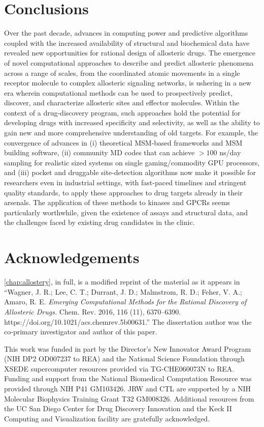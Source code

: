 \section{Conclusions}
\par Over the past decade, advances in computing power and predictive algorithms coupled with the increased availability of structural and biochemical data have revealed new opportunities for rational design of allosteric drugs. The emergence of novel computational approaches to describe and predict allosteric phenomena across a range of scales, from the coordinated atomic movements in a single receptor molecule to complex allosteric signaling networks, is ushering in a new era wherein computational methods can be used to prospectively predict, discover, and characterize allosteric sites and effector molecules. Within the context of a drug-discovery program, such approaches hold the potential for developing drugs with increased specificity and selectivity, as well as the ability to gain new and more comprehensive understanding of old targets. For example, the convergence of advances in (i) theoretical MSM-based frameworks and MSM building software, (ii) community MD codes that can achieve $>100$ ns/day sampling for realistic sized systems on single gaming/commodity GPU processors, and (iii) pocket and druggable site-detection algorithms now make it possible for researchers even in industrial settings, with fast-paced timelines and stringent quality standards, to apply these approaches to drug targets already in their arsenals. The application of these methods to kinases and GPCRs seems particularly worthwhile, given the existence of assays and structural data, and the challenges faced by existing drug candidates in the clinic.
\section{Acknowledgements}
\par \cref{chap:allostery}, in full, is a modified reprint of the material as it appears in ``Wagner, J. R.; Lee, C. T.; Durrant, J. D.; Malmstrom, R. D.; Feher, V. A.; Amaro, R. E. \emph{Emerging Computational Methods for the Rational Discovery of Allosteric Drugs.} Chem. Rev. 2016, 116 (11), 6370–6390. https://doi.org/10.1021/acs.chemrev.5b00631.''
The dissertation author was the co-primary investigator and author of this paper.

\par This work was funded in part by the Director's New Innovator Award Program (NIH DP2 OD007237 to REA) and the National Science Foundation through XSEDE supercomputer resources provided via TG-CHE060073N to REA. Funding and support from the National Biomedical Computation Resource was provided through NIH P41 GM103426. JRW and CTL are supported by a NIH Molecular Biophysics Training Grant T32 GM008326. Additional resources from the UC San Diego Center for Drug Discovery Innovation and the Keck II Computing and Visualization facility are gratefully acknowledged.
